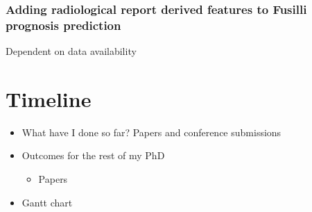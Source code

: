 \subsubsection{Adding radiological report derived features to Fusilli prognosis prediction}
Dependent on data availability

\section{Timeline}
\begin{itemize}
    \item What have I done so far? Papers and conference submissions
    \item Outcomes for the rest of my PhD
    \begin{itemize}
        \item Papers
    \end{itemize}
    \item Gantt chart
\end{itemize}
